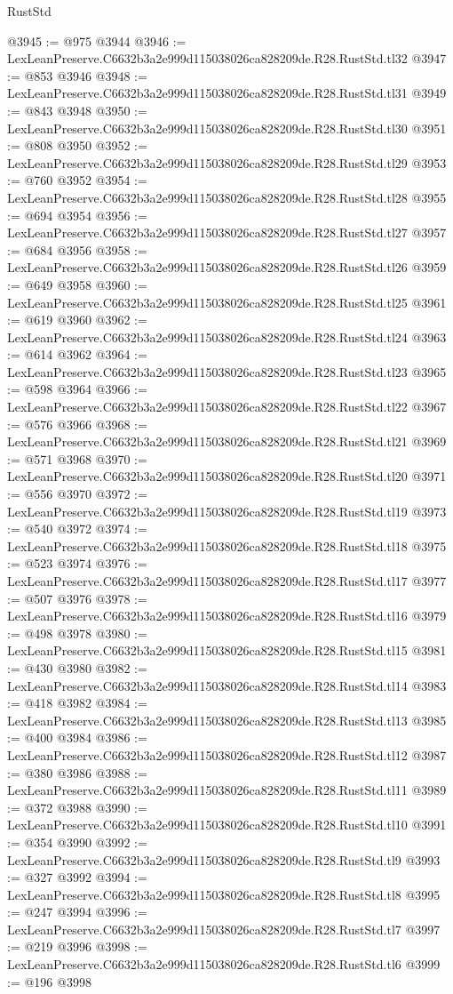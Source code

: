 \begin{lexlean}{RustStd}
\begin{coremodule}
@3945 := @975 @3944
@3946 := LexLeanPreserve.C6632b3a2e999d115038026ca828209de.R28.RustStd.tl32
@3947 := @853 @3946
@3948 := LexLeanPreserve.C6632b3a2e999d115038026ca828209de.R28.RustStd.tl31
@3949 := @843 @3948
@3950 := LexLeanPreserve.C6632b3a2e999d115038026ca828209de.R28.RustStd.tl30
@3951 := @808 @3950
@3952 := LexLeanPreserve.C6632b3a2e999d115038026ca828209de.R28.RustStd.tl29
@3953 := @760 @3952
@3954 := LexLeanPreserve.C6632b3a2e999d115038026ca828209de.R28.RustStd.tl28
@3955 := @694 @3954
@3956 := LexLeanPreserve.C6632b3a2e999d115038026ca828209de.R28.RustStd.tl27
@3957 := @684 @3956
@3958 := LexLeanPreserve.C6632b3a2e999d115038026ca828209de.R28.RustStd.tl26
@3959 := @649 @3958
@3960 := LexLeanPreserve.C6632b3a2e999d115038026ca828209de.R28.RustStd.tl25
@3961 := @619 @3960
@3962 := LexLeanPreserve.C6632b3a2e999d115038026ca828209de.R28.RustStd.tl24
@3963 := @614 @3962
@3964 := LexLeanPreserve.C6632b3a2e999d115038026ca828209de.R28.RustStd.tl23
@3965 := @598 @3964
@3966 := LexLeanPreserve.C6632b3a2e999d115038026ca828209de.R28.RustStd.tl22
@3967 := @576 @3966
@3968 := LexLeanPreserve.C6632b3a2e999d115038026ca828209de.R28.RustStd.tl21
@3969 := @571 @3968
@3970 := LexLeanPreserve.C6632b3a2e999d115038026ca828209de.R28.RustStd.tl20
@3971 := @556 @3970
@3972 := LexLeanPreserve.C6632b3a2e999d115038026ca828209de.R28.RustStd.tl19
@3973 := @540 @3972
@3974 := LexLeanPreserve.C6632b3a2e999d115038026ca828209de.R28.RustStd.tl18
@3975 := @523 @3974
@3976 := LexLeanPreserve.C6632b3a2e999d115038026ca828209de.R28.RustStd.tl17
@3977 := @507 @3976
@3978 := LexLeanPreserve.C6632b3a2e999d115038026ca828209de.R28.RustStd.tl16
@3979 := @498 @3978
@3980 := LexLeanPreserve.C6632b3a2e999d115038026ca828209de.R28.RustStd.tl15
@3981 := @430 @3980
@3982 := LexLeanPreserve.C6632b3a2e999d115038026ca828209de.R28.RustStd.tl14
@3983 := @418 @3982
@3984 := LexLeanPreserve.C6632b3a2e999d115038026ca828209de.R28.RustStd.tl13
@3985 := @400 @3984
@3986 := LexLeanPreserve.C6632b3a2e999d115038026ca828209de.R28.RustStd.tl12
@3987 := @380 @3986
@3988 := LexLeanPreserve.C6632b3a2e999d115038026ca828209de.R28.RustStd.tl11
@3989 := @372 @3988
@3990 := LexLeanPreserve.C6632b3a2e999d115038026ca828209de.R28.RustStd.tl10
@3991 := @354 @3990
@3992 := LexLeanPreserve.C6632b3a2e999d115038026ca828209de.R28.RustStd.tl9
@3993 := @327 @3992
@3994 := LexLeanPreserve.C6632b3a2e999d115038026ca828209de.R28.RustStd.tl8
@3995 := @247 @3994
@3996 := LexLeanPreserve.C6632b3a2e999d115038026ca828209de.R28.RustStd.tl7
@3997 := @219 @3996
@3998 := LexLeanPreserve.C6632b3a2e999d115038026ca828209de.R28.RustStd.tl6
@3999 := @196 @3998

\end{coremodule}
\end{lexlean}
